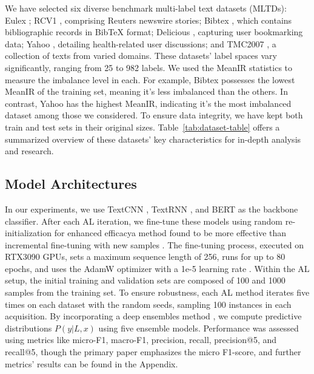 \documentclass[letterpaper]{article} %
\begin{document}
We have selected six diverse benchmark multi-label text datasets (MLTDs): Eulex \cite{LozaMenca2010}; RCV1 \cite{10.5555/1005332.1005345}, comprising Reuters newswire stories; Bibtex \cite{Katakis2008MultilabelTC}, which contains bibliographic records in BibTeX format; Delicious \cite{Tsoumakas2008EffectiveAE}, capturing user bookmarking data; Yahoo \cite{10.5555/2968618.2968710}, detailing health-related user discussions; and TMC2007 \cite{1559692}, a collection of texts from varied domains.
These datasets' label spaces vary significantly, ranging from 25 to 982 labels. We used the MeanIR statistics to measure the imbalance level in each.
For example, Bibtex possesses the lowest MeanIR of the training set, meaning it's less imbalanced than the others. In contrast, Yahoo has the highest MeanIR, indicating it's the most imbalanced dataset among those we considered.
To ensure data integrity, we have kept both train and test sets in their original sizes. Table~\ref{tab:dataset-table} offers a summarized overview of these datasets' key characteristics for in-depth analysis and research.






\subsection{Model Architectures}

In our experiments, we use TextCNN \cite{kim-2014-convolutional}, TextRNN \cite{8632592}, and BERT \cite{devlin-etal-2019-bert} as the backbone classifier.
After each AL iteration, we fine-tune these models using random re-initialization \cite{frankle2018lottery} for enhanced efficacya method found to be more effective than incremental fine-tuning with new samples \cite{gal2017deep}. The fine-tuning process, executed on RTX3090 GPUs, sets a maximum sequence length of 256, runs for up to 80 epochs, and uses the AdamW optimizer with a 1e-5 learning rate \cite{nguyen-etal-2022-hardness,Nguyen_Tan_Du_Buntine_Beare_Chen_2023,nguyen2023lowresource}. Within the AL setup, the initial training and validation sets are composed of 100 and 1000 samples from the training set. To ensure robustness, each AL method iterates five times on each dataset with the random seeds, sampling 100 instances in each acquisition. By incorporating a deep ensembles method \cite{10.5555/3295222.3295387}, we compute predictive distributions $P(y| L, x)$ using five ensemble models. Performance was assessed using metrics like micro-F1, macro-F1, precision, recall, precision@5, and recall@5, though the primary paper emphasizes the micro F1-score, and further metrics' results can be found in the Appendix.
\end{document}
